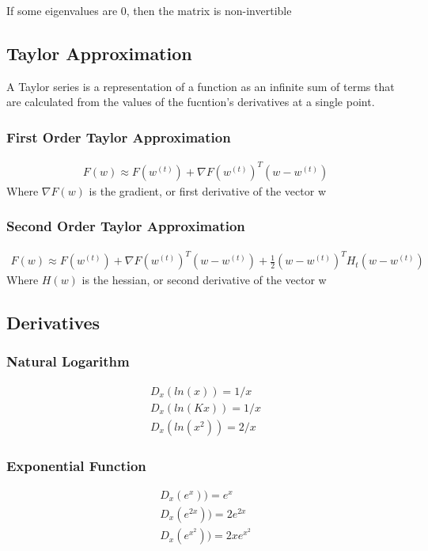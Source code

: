 \documentclass{article}
\begin{document}
If some eigenvalues are 0, then the matrix is non-invertible

\subsection{Taylor Approximation}
A Taylor series is a representation of a function as an infinite sum of terms that are calculated from the values of the fucntion's derivatives at a single point.
\subsubsection{First Order Taylor Approximation}
\begin{align*}
F(w) \approx F(w^{(t)}) + \nabla F(w^{(t)})^T(w-w^{(t)})
\end{align*}
Where $\nabla F(w)$ is the gradient, or first derivative of the vector w
\subsubsection{Second Order Taylor Approximation}
\begin{align*}
F(w) \approx F(w^{(t)}) + \nabla F(w^{(t)})^T(w-w^{(t)}) + \frac{1}{2}(w-w^{(t)})^T  H_t(w-w^{(t)})
\end{align*}
Where $H(w)$ is the hessian, or second derivative of the vector w

\subsection{Derivatives}
\subsubsection{Natural Logarithm}
\begin{align*}
D_x(ln(x)) = 1/x\\
D_x(ln(Kx)) = 1/x\\
D_x(ln(x^2)) = 2/x
\end{align*}

\subsubsection{Exponential Function}
\begin{align*}
D_x(e^x)) = e^x\\
D_x(e^{2x})) = 2e^{2x}\\
D_x(e^{x^2})) = 2xe^{x^2}
\end{align*}
\end{document}
